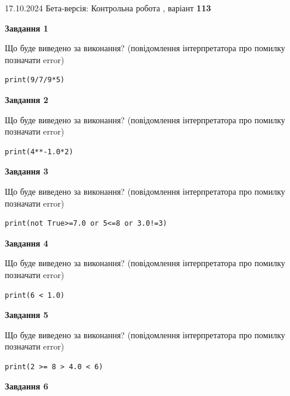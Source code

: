 \documentclass[12pt, ukrainian]{article}
\begin{document}
{\Large{17.10.2024 Бета-версія: Контрольна робота , варіант  \No \textbf { 113 }\par}}
{
\begin {large}
{\begin {center}\textbf{Завдання 1}\end {center}}

Що буде виведено за виконання? (повідомлення інтерпретатора про помилку позначати error)\par
\begin{verbatim}
print(9/7/9*5)
\end{verbatim}

{\begin {center}\textbf{Завдання 2}\end {center}}

Що буде виведено за виконання? (повідомлення інтерпретатора про помилку позначати error)\par
\begin{verbatim}
print(4**-1.0*2)
\end{verbatim}

{\begin {center}\textbf{Завдання 3}\end {center}}

Що буде виведено за виконання? (повідомлення інтерпретатора про помилку позначати error)\par
\begin{verbatim}
print(not True>=7.0 or 5<=8 or 3.0!=3)
\end{verbatim}

{\begin {center}\textbf{Завдання 4}\end {center}}

Що буде виведено за виконання? (повідомлення інтерпретатора про помилку позначати error)\par
\begin{verbatim}
print(6 < 1.0)
\end{verbatim}

{\begin {center}\textbf{Завдання 5}\end {center}}

Що буде виведено за виконання? (повідомлення інтерпретатора про помилку позначати error)\par
\begin{verbatim}
print(2 >= 8 > 4.0 < 6)
\end{verbatim}

{\begin {center}\textbf{Завдання 6}\end {center}}


\end{large}}
\end{document}
